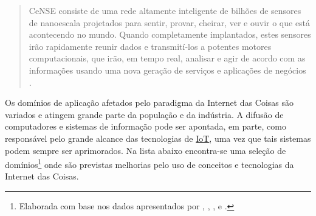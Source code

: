\documentclass[twoside,english,brazilian]{UNISINOSmonografia}
\begin{document}
\begin{quote}
CeNSE consiste de uma rede altamente inteligente de bilhões de sensores de 
nanoescala projetados para sentir, provar, cheirar, ver e ouvir o que está 
acontecendo no mundo. Quando completamente implantados, estes sensores irão 
rapidamente reunir dados e transmití-los a potentes motores computacionais, 
que irão, em tempo real, analisar e agir de acordo com as informações usando 
uma nova geração de serviços e aplicações de negócios \cite{HP2009}.

\end{quote}

Os domínios de aplicação afetados pelo paradigma da Internet das Coisas são 
variados e atingem grande parte da população e da indústria.
A difusão de computadores e sistemas de informação pode ser apontada, em 
parte, como responsável pelo grande alcance das tecnologias de \hyperref[siglas]{IoT}, uma vez 
que tais sistemas podem sempre ser aprimorados.
Na lista abaixo encontra-se uma seleção de domínios\footnote{
Elaborada com base nos dados apresentados por 
,
,
,
 e
.
} onde são previstas melhorias pelo uso de conceitos e tecnologias da Internet 
das Coisas.
\end{document}
